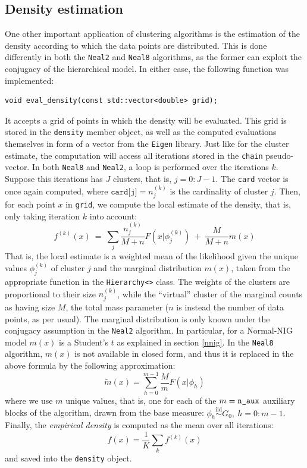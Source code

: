 \subsection{Density estimation}
One other important application of clustering algorithms is the estimation of the density according to which the data points are distributed.
This is done differently in both the \verb|Neal2| and \verb|Neal8| algorithms, as the former can exploit the conjugacy of the hierarchical model.
In either case, the following function was implemented:
\begin{verbatim}
void eval_density(const std::vector<double> grid);
\end{verbatim}
It accepts a grid of points in which the density will be evaluated.
This grid is stored in the \verb|density| member object, as well as the computed evaluations themselves in form of a vector from the \verb|Eigen| library.
Just like for the cluster estimate, the computation will access all iterations stored in the \verb|chain| pseudo-vector.
In both \verb|Neal8| and \verb|Neal2|, a loop is performed over the iterations $k$.
Suppose this iterations has $J$ clusters, that is, $j=0:J-1$.
The \verb|card| vector is once again computed, where $\texttt{card[j]} = n^{(k)}_j$ is the cardinality of cluster $j$.
Then, for each point $x$ in \verb|grid|, we compute the local estimate of the density, that is, only taking iteration $k$ into account:
$$
f^{(k)}(x) \ = \ \sum_j \frac{n^{(k)}_j}{M+n} F\left(x | \phi^{(k)}_j\right) \ + \ \frac{M}{M+n} m(x)
$$
That is, the local estimate is a weighted mean of the likelihood given the unique values $\phi^{(k)}_j$ of cluster $j$ and the marginal distribution $m(x)$, taken from the appropriate function in the \verb|Hierarchy<>| class.
The weights of the clusters are proportional to their size $n^{(k)}_j$, while the ``virtual'' cluster of the marginal counts as having size $M$, the total mass parameter ($n$ is instead the number of data points, as per usual).
The marginal distribution is only known under the conjugacy assumption in the \verb|Neal2| algorithm.
In particular, for a Normal-NIG model $m(x)$ is a Student's $t$ as explained in section \ref{nnig}.
In the \verb|Neal8| algorithm, $m(x)$ is not available in closed form, and thus it is replaced in the above formula by the following approximation:
$$
\tilde m(x) = \sum_{h=0}^{m-1} \frac{M}{m}  F\left(x | \phi_h\right)
$$ %
where we use $m$ unique values, that is, one for each of the $m = \verb|n_aux|$ auxiliary blocks of the algorithm, drawn from the base measure: $\phi_{h} \overset{\text{iid}}{\sim} G_0, \ h=0:m-1$. \\
Finally, the \emph{empirical density} is computed as the mean over all iterations:
$$
f(x) = \frac{1}{K} \sum_k f^{(k)}(x)
$$
and saved into the \verb|density| object.

